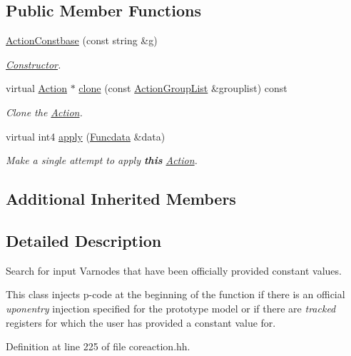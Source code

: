 \subsection*{Public Member Functions}
\begin{DoxyCompactItemize}
\item 
\mbox{\hyperlink{class_action_constbase_a1c7e4e0b94a6c384c929f0276d4ca025}{Action\+Constbase}} (const string \&g)
\begin{DoxyCompactList}\small\item\em \mbox{\hyperlink{class_constructor}{Constructor}}. \end{DoxyCompactList}\item 
virtual \mbox{\hyperlink{class_action}{Action}} $\ast$ \mbox{\hyperlink{class_action_constbase_ab9c45ce9b49d6543abced9909598f2e0}{clone}} (const \mbox{\hyperlink{class_action_group_list}{Action\+Group\+List}} \&grouplist) const
\begin{DoxyCompactList}\small\item\em Clone the \mbox{\hyperlink{class_action}{Action}}. \end{DoxyCompactList}\item 
virtual int4 \mbox{\hyperlink{class_action_constbase_acdc2434caa56bded4425c19e0b68bdfc}{apply}} (\mbox{\hyperlink{class_funcdata}{Funcdata}} \&data)
\begin{DoxyCompactList}\small\item\em Make a single attempt to apply {\bfseries{this}} \mbox{\hyperlink{class_action}{Action}}. \end{DoxyCompactList}\end{DoxyCompactItemize}
\subsection*{Additional Inherited Members}


\subsection{Detailed Description}
Search for input Varnodes that have been officially provided constant values. 

This class injects p-\/code at the beginning of the function if there is an official {\itshape uponentry} injection specified for the prototype model or if there are {\itshape tracked} registers for which the user has provided a constant value for. 

Definition at line 225 of file coreaction.\+hh.



